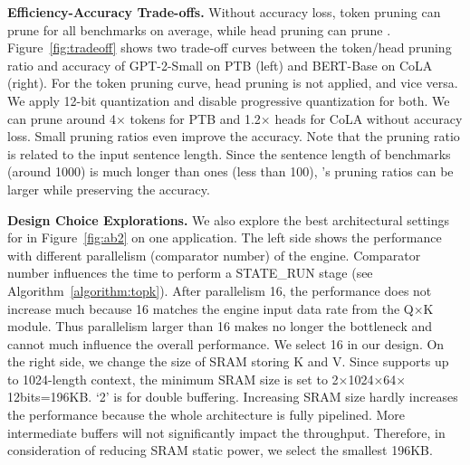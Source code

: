 \textbf{Efficiency-Accuracy Trade-offs.}
Without accuracy loss, token pruning can prune \prunedramsaving\x for all benchmarks on average, while head pruning can prune \hpdramsaving\x. Figure~\ref{fig:tradeoff} shows two trade-off curves between the token/head pruning ratio and accuracy of GPT-2-Small on PTB (left) and BERT-Base on CoLA (right). For the token pruning curve, head pruning is not applied, and vice versa. We apply 12-bit quantization and disable progressive quantization for both. We can prune around 4$\times$ tokens for PTB and 1.2$\times$ heads for CoLA without accuracy loss. Small pruning ratios even improve the accuracy. Note that the pruning ratio is related to the input sentence length. Since the sentence length of \gpttwo benchmarks (around 1000) is much longer than \bert ones (less than 100), \gpttwo's pruning ratios can be larger while preserving the accuracy.

\textbf{Design Choice Explorations.} We also explore the best architectural settings for \spattenfull\xspace in Figure~\ref{fig:ab2} on one \gpttwo application. The left side shows the performance with different parallelism (comparator number) of the \topk engine. 
Comparator number influences the time to perform a STATE\_RUN stage (see Algorithm~\ref{algorithm:topk}). 
After parallelism 16, the performance does not increase much because 16 matches the \topk engine input data rate from the Q$\times$K module. 
Thus parallelism larger than 16 makes \topk no longer the bottleneck and cannot much influence the overall performance. We select 16 in our design. 
On the right side, we change the size of SRAM storing K and V. Since \name supports up to 1024-length context, the minimum SRAM size is set to 2$\times$1024$\times$64$\times$12bits=196KB. `2' is for double buffering. Increasing SRAM size hardly increases the performance because the whole architecture is fully pipelined. More intermediate buffers will not significantly impact the throughput. 
Therefore, in consideration of reducing SRAM static power, we select the smallest 196KB.







